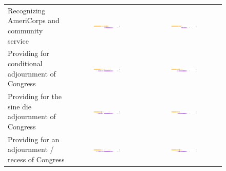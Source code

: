 \begin{figure}
\begin{tabular}{|p{4.3cm}|c|c|}
Recognizing AmeriCorps and community service
& \includegraphics[width=0.4\textwidth]{chapter_inferring_issue_preferences/figures/3397_ideal_point_7.pdf}
& \includegraphics[width=0.4\textwidth]{chapter_inferring_issue_preferences/figures/3397_adjusted_ideal_point_7.pdf} \\

Providing for conditional adjournment of Congress
& \includegraphics[width=0.4\textwidth]{chapter_inferring_issue_preferences/figures/3397_ideal_point_6.pdf}
& \includegraphics[width=0.4\textwidth]{chapter_inferring_issue_preferences/figures/3397_adjusted_ideal_point_6.pdf} \\

Providing for the sine die adjournment of Congress
& \includegraphics[width=0.4\textwidth]{chapter_inferring_issue_preferences/figures/3397_ideal_point_5.pdf}
& \includegraphics[width=0.4\textwidth]{chapter_inferring_issue_preferences/figures/3397_adjusted_ideal_point_5.pdf} \\

Providing for an adjournment / recess of Congress
& \includegraphics[width=0.4\textwidth]{chapter_inferring_issue_preferences/figures/3397_ideal_point_4.pdf}
& \includegraphics[width=0.4\textwidth]{chapter_inferring_issue_preferences/figures/3397_adjusted_ideal_point_4.pdf} \\


\end{tabular}
\end{figure}
